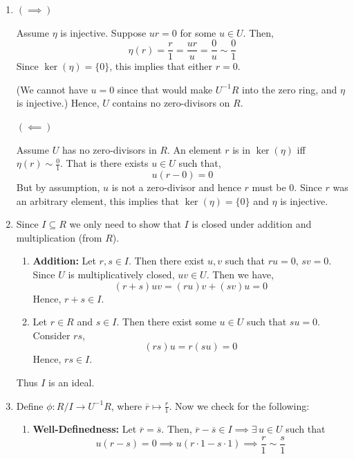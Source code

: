 \documentclass[Notebook.tex]{subfiles}
\begin{document}
\begin{solution}
	\bbni
	\begin{enumerate}
		\item $(\implies)$
		
		Assume $\eta$ is injective. Suppose $ur = 0$ for some $u \in U$. Then, 
		\[\eta(r) = \frac{r}{1} = \frac{ur}{u} = \frac{0}{u} \sim \frac{0}{1}\]
		Since $\ker(\eta) = \{0\}$, this implies that either $r = 0$. 
		
		(We cannot have $u = 0$ since that would make $U^{-1}R$ into the zero ring, and $\eta$ is injective.) Hence, $U$ contains no zero-divisors on $R$.


		$(\impliedby)$

		Assume $U$ has no zero-divisors in $R$. An element $r$ is in $\ker(\eta)$ iff $\eta(r) \sim \frac{0}{1}$. That is there exists $u \in U$ such that, 
		\[u(r - 0) = 0 \]
		But by assumption, $u$ is not a zero-divisor and hence $r$ must be $0$. Since $r$ was an arbitrary element, this implies that $\ker(\eta) =\{0\}$ and $\eta$ is injective. 

		\item Since $I \subseteq R$ we only need to show that $I$ is closed under addition and multiplication (from $R$). 
		\begin{enumerate}
			\item \textbf{Addition:} Let $r, s \in I$. Then there exist $u, v$ such that $ru = 0, \, sv = 0$. Since $U$ is multiplicatively closed, $uv \in U$. Then we have,
			\[(r+s)uv = (ru)v + (sv)u = 0\]
			Hence, $r + s \in I$. 

			\item Let $r \in R$ and $s \in I$. Then there exist some $u \in U$ such that $su = 0$. Consider $rs$, 
			\[(rs)u = r(su) = 0\]
			Hence, $rs \in I$. 
		\end{enumerate}

		Thus $I$ is an ideal. 

		\item Define $\phi: R/I \to U^{-1}R$, where $\overline{r} \mapsto \frac{r}{1}$. Now we check for the following: 
		\begin{enumerate}
			\item \textbf{Well-Definedness:} Let $\overline{r} = \overline{s}$. Then, $\overline{r} - \overline{s} \in I \implies \exists \, u \in U$ such that 
			\[u(r-s) = 0 \implies u(r \cdot 1 - s \cdot 1) \implies \frac{r}{1} \sim \frac{s}{1}\]
			

\end{enumerate}
\end{enumerate}
\end{solution}
\end{document}
